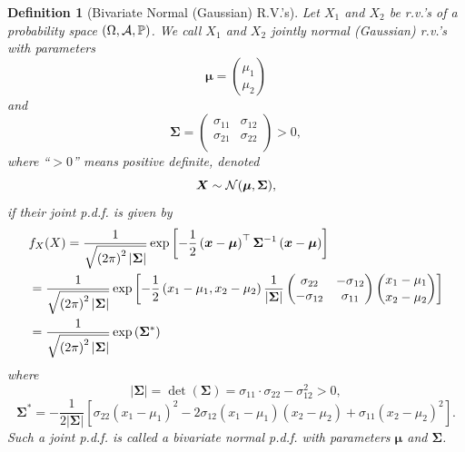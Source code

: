 \documentclass[openany,12pt]{book}
\newtheorem{definition}{Definition}[chapter]
\begin{document}
\begin{definition}[Bivariate Normal (Gaussian) R.V.'s]
  Let $X_{1}$ and $X_{2}$ be r.v.'s of a probability space $(\Omega,\mathcal{A},\mathbb{P})$. We call $X_{1}$ and $X_{2}$ jointly normal (Gaussian) r.v.'s with parameters
  \[\bm{\mu}=\binom{\mu_{1}}{\mu_{2}}\]
  and
  \[\bm{\Sigma} = \begin{pmatrix}
      \sigma_{11} & \sigma_{12} \\
      \sigma_{21} & \sigma_{22} \\
    \end{pmatrix} > 0,\]
  where ``$>0$'' means positive definite, denoted \[\bm{X}\sim \mathcal{N}(\bm{\mu},\bm{\Sigma}),\] if their joint p.d.f. is given by
  \[\begin{aligned}
       & f_{X}(X)= \frac{1}{\sqrt{{(2\pi)}^{2}\left|\bm{\Sigma}\right|}}\exp\left[ - \frac{1}{2}\left(\bm{x} -\bm{\mu} \right)^{\top}\bm{\Sigma}_{}^{-1}\left( \bm{x}-\bm{\mu} \right) \right]                                                               \\
       & = \frac{1}{\sqrt{{(2\pi)}^{2}\left|\bm{\Sigma}\right|}}\exp\left[ - \frac{1}{2}\left( x_{1} - \mu_{1}, x_{2} - \mu_{2} \right)\frac{1}{\left| \bm{\Sigma} \right|}\begin{pmatrix}
          \sigma_{22}   & {- \sigma}_{12} \\
          - \sigma_{12} & \sigma_{11}     \\
        \end{pmatrix} \binom{x_{1} - \mu_{1}}{x_{2} - \mu_{2}} \right] \\
       & = \frac{1}{\sqrt{{(2\pi)}^{2}\left|\bm{\Sigma}\right|}}\exp\left(\bm{\Sigma}_{}^* \right)
    \end{aligned}\]
  where
  \[\left|\bm{\Sigma}\right| = \det\left( \bm{\Sigma} \right)= \sigma_{11} \cdot \sigma_{22} - \sigma_{12}^{2} > 0,\]
  \[\bm{\Sigma}_{}^*=- \frac{1}{2\left| \bm{\Sigma} \right|}\left[ \sigma_{22}\left( x_{1} - \mu_{1} \right)^{2} - 2\sigma_{12}\left( x_{1} - \mu_{1} \right)\left( x_{2} - \mu_{2} \right) + \sigma_{11}\left( x_{2} - \mu_{2} \right)^{2} \right].\]
  Such a joint p.d.f. is called a bivariate normal p.d.f. with parameters
  $\bm{\mu}$ and $\bm{\Sigma}$.
\end{definition}
\end{document}
